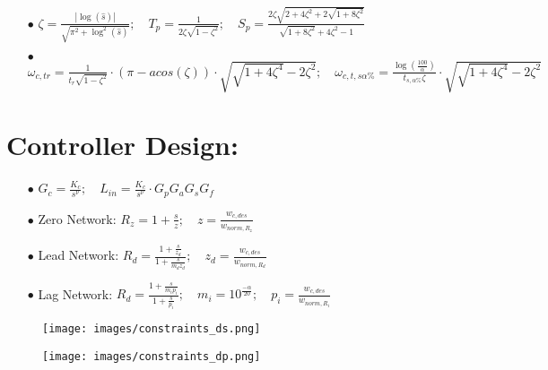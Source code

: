\documentclass{article}
\begin{document}
\begin{enumerate}
		\item[$\bullet$] $ \zeta = \frac{\left| \log (\hat{s}) \right|}{\sqrt{\pi^2 + \log^2 (\hat{s})}}; \quad 
		T_p = \frac{1}{2\zeta \sqrt{1-\zeta^2}}; \quad
		S_p = \frac{2\zeta \sqrt{2+4\zeta^2+2\sqrt{1+8\zeta^2}}}{\sqrt{1+8\zeta^2}+4\zeta^2-1}$
		
		\item[$\bullet$] $ \omega_{c,tr} = \frac{1}{t_r\sqrt{1-\zeta^2}} \cdot
		(\pi - acos(\zeta)) \cdot \sqrt{\sqrt{1+4\zeta^4}-2\zeta^2}; \quad
		\omega_{c,t,s\alpha \%} = \frac{\log(\frac{100}{\alpha})}{t_{s,\alpha \%}\zeta} \cdot \sqrt{\sqrt{1+4\zeta^4}-2\zeta^2} $
		
	\end{enumerate}
	\newpage
	\section{Controller Design:}
	\begin{enumerate}
		\item[$\bullet$] $ G_c = \frac{K_c}{s^\nu}; \quad
		L_{in} = \frac{K_c}{s^\nu} \cdot G_pG_aG_sG_f $
		
		\item[$\bullet$] Zero Network: $ R_z = 1 + \frac{s}{z}; \quad
		z = \frac{w_{c,des}}{w_{norm,R_z}} $
		
		\item[$\bullet$] Lead Network: $ R_d = \frac{1 + \frac{s}{z_d}}{1 + \frac{s}{m_dz_d}}; \quad
		z_d = \frac{w_{c,des}}{w_{norm,R_d}} $
		
		\item[$\bullet$] Lag Network: $ R_d = \frac{1 + \frac{s}{m_ip_i}}{1 + \frac{s}{p_i}}; \quad
		m_i = 10^{\frac{-\alpha}{20}}; \quad
		p_i = \frac{w_{c,des}}{w_{norm,R_i}} $
		
	\end{enumerate}
	
	\begin{figure}[htbp]
		\centering
		\begin{minipage}{0.45\textwidth} %
			\centering
			\texttt{[image: images/constraints\_ds.png]} %
			\label{fig:image1}
		\end{minipage}
		\hfill %
		\vrule width 0.5pt %
		\hfill %
		\begin{minipage}{0.45\textwidth} %
			\centering
			\vspace{5pt}
			\texttt{[image: images/constraints\_dp.png]} %
			\label{fig:image2}
		\end{minipage}
	\end{figure}
	
	
\end{document}

